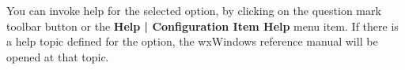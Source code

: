 You can invoke help for the selected option, by clicking
on the question mark toolbar button or the {\bf Help | Configuration Item Help} menu
item. If there is a help topic defined for the option, the
wxWindows reference manual will be opened at that topic.

\begin{comment}
\chapter{Getting started: a step-by-step guide}\label{gettingstarted}%
\setheader{{\it CHAPTER \thechapter}}{}{}{}{}{{\it CHAPTER \thechapter}}%
\setfooter{\thepage}{}{}{}{}{\thepage}%

This section will quickly get you up and running with \ctshortname. Click
on \helpref{Step 1}{step1} to start. If you are
using a Mac, please interpret 'left-click' to mean 'click', and
'right-click' to mean 'control-click'.

\section{Step 1: creating a new configuration}\label{step1}

When you run \ctshortname for the first time, you are presented with an
empty configuration window.

Go to \helpref{Step 2}{step2} to learn how to do the next thing.

\section{Step 2: doing something else}\label{step2}

Go to \helpref{Step 3}{step3} to learn how to do a third thing.

\section{Step 3: a third thing}\label{step3}

Go to \helpref{Step 4}{step4} to learn about saving your document and reloading it.

\section{Step 4: saving and loading documents}\label{step4}

You may wish to save a document, so you can come back to it later. Click on {\bf File | Save} or
the \image{}{save.png} toolbar button. The first time you save the file, you will be prompted
for a filename: you can accept the default one provided, or choose another.


\end{comment}
